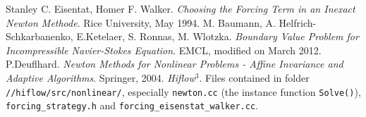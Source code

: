 \documentclass[a4paper, 11pt, twoside]{article}
\begin{document}


\listoffigures

\listoftables

\begin{thebibliography}{}
 Stanley C. Eisentat, Homer F. Walker. \emph{Choosing the Forcing Term in an Inexact Newton Methode}. Rice University, May 1994.
 M. Baumann, A. Helfrich-Schkarbanenko, E.Ketelaer, S. Ronnas, M. Wlotzka. \emph{Boundary Value Problem for Incompressible Navier-Stokes Equation}. EMCL, modified on March 2012.
 P.Deuflhard. \emph{Newton Methods for Nonlinear Problems - Affine Invariance and Adaptive Algorithms}. Springer, 2004.
 \emph{Hiflow$^3$}. Files contained in folder \verb+//hiflow/src/nonlinear/+, especially \verb+newton.cc+ (the instance function \verb+Solve()+), \verb+forcing_strategy.h+ and \verb+forcing_eisenstat_walker.cc+.
\end{thebibliography}

\printindex
\end{document}

